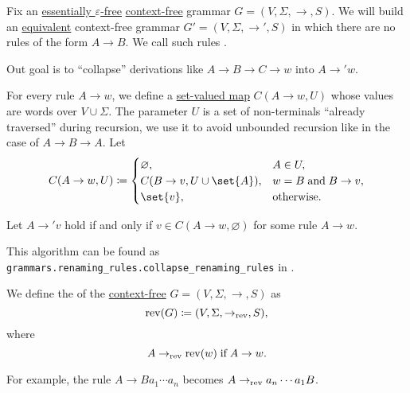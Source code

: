 \begin{algorithm}\label{alg:renaming_rule_collapse}
  Fix an \hyperref[def:epsilon_free_grammar]{essentially \( \varepsilon \)-free} \hyperref[def:chomsky_hierarchy/context_free]{context-free} grammar \( G = (V, \Sigma, \to, S) \). We will build an \hyperref[def:formal_grammar/equivalent]{equivalent} context-free grammar \( G' = (V, \Sigma, \to', S) \) in which there are no rules of the form \( A \to B \). We call such rules .

  Out goal is to \enquote{collapse} derivations like \( A \to B \to C \to w \) into \( A \to' w \).

  \begin{thmenum}
     For every rule \( A \to w \), we define a \hyperref[def:function]{set-valued map} \( C(A \to w, U) \) whose values are words over \( V \cup \Sigma \). The parameter \( U \) is a set of non-terminals \enquote{already traversed} during recursion, we use it to avoid unbounded recursion like in the case of \( A \to B \to A \). Let
    \begin{equation*}
      C(A \to w, U) \coloneqq \begin{cases}
        \varnothing,                  &A \in U, \\
        C(B \to v, U \cup \set{ A }), &w = B \T{and} B \to v, \\
        \set{ v },                    &\T{otherwise.}
      \end{cases}
    \end{equation*}

     Let \( A \to' v \) hold if and only if \( v \in C(A \to w, \varnothing) \) for some rule \( A \to w \).
  \end{thmenum}
\end{algorithm}
\begin{comments}
  \item This algorithm can be found as \texttt{grammars.renaming\_rules.collapse\_renaming\_rules} in \cite{code}.
\end{comments}

\begin{definition}\label{def:reverse_grammar}
  We define the  of the \hyperref[def:chomsky_hierarchy/context_free]{context-free} \( G = (V, \Sigma, \to, S) \) as
  \begin{equation*}
    \operatorname{rev}(G) \coloneqq (V, \Sigma, \to_{\operatorname{rev}}, S),
  \end{equation*}
  where
  \begin{equation*}
    A \to_{\op{rev}} \op{rev}(w) \T{if} A \to w.
  \end{equation*}
\end{definition}
\begin{comments}
  \item For example, the rule \( A \to Ba_1 \cdots a_n \) becomes \( A \to_{\operatorname{rev}} a_n \cdots a_1 B \).
\end{comments}

